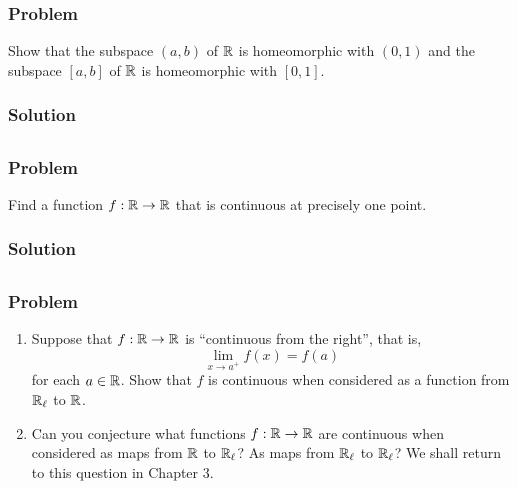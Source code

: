 \subsubsection{Problem}
Show that the subspace $(a, b)$ of $\mathbb R$ is homeomorphic with $(0, 1)$ and the subspace $[a, b]$ of $\mathbb R$ is homeomorphic with $[0, 1]$.

\subsubsection{Solution}
\todo


\setcounter{subsection}{5} %
\subsection{}

\subsubsection{Problem}
Find a function $f : \mathbb R \to \mathbb R$ that is continuous at precisely one point.

\subsubsection{Solution}
\todo


\subsection{}

\subsubsection{Problem}
\begin{enumerate}
    \item Suppose that $f : \mathbb R \to \mathbb R$ is ``continuous from the right'', that is,
    \[ \lim_{x \to a^+}f(x) = f(a) \]
    for each $a \in \mathbb R$. Show that $f$ is continuous when considered as a function from $\mathbb R_\ell$ to $\mathbb R$.
    \item Can you conjecture what functions $f : \mathbb R \to \mathbb R$ are continuous when considered as maps from $\mathbb R$ to $\mathbb R_\ell$? As maps from $\mathbb R_\ell$ to $\mathbb R_\ell$? We shall return to this question in Chapter 3.
\end{enumerate}

